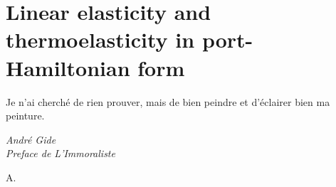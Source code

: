 \chapter[Elasticity in port-Hamiltonian form]{Linear elasticity and thermoelasticity in port-Hamiltonian form}
\label{chap:first_chapter}


\epigraph{Je n’ai cherché de rien prouver, mais de bien peindre et d’éclairer bien ma peinture.}{\textit{André Gide \\ Preface de L’Immoraliste}}

\minitoc


\lettrine{\color{theme}A}{}.
